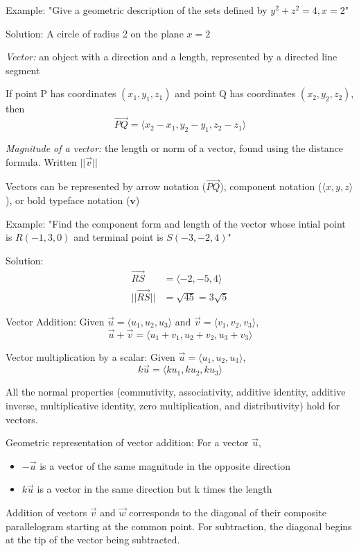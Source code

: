 \documentclass[12pt]{article}
\begin{document}
Example:
"Give a geometric description of the sets defined by $y^2 + z^2 = 4, x = 2$"

Solution:
A circle of radius 2 on the plane $x = 2$

\emph{Vector:} an object with a direction and a length, represented by a directed line segment

If point P has coordinates $(x_1, y_1, z_1)$ and point Q has coordinates $(x_2, y_2, z_2)$, then 
$$\vec{PQ} = \langle x_2 - x_1, y_2 - y_1, z_2 - z_1 \rangle$$

\emph{Magnitude of a vector:} the length or norm of a vector, found using the distance formula. Written $||\vec{v}||$

Vectors can be represented by arrow notation ($\vec{PQ}$), component notation ($\langle x, y, z\rangle$), or bold typeface notation ($\mathbf{v}$)

Example:
"Find the component form and length of the vector whose intial point is $R(-1, 3, 0)$ and terminal point is $S(-3, -2, 4)$"

Solution:
\begin{align*}
    \vec{RS} &= \langle -2, -5, 4\rangle\\
    ||\vec{RS}|| &= \sqrt{45} = 3\sqrt{5}
\end{align*}

Vector Addition:
Given $\vec{u} = \langle u_1, u_2, u_3\rangle$ and $\vec{v} = \langle v_1, v_2, v_3\rangle$,
$$\vec{u} + \vec{v} = \langle u_1 + v_1, u_2 + v_2, u_3 + v_3\rangle$$

Vector multiplication by a scalar:
Given $\vec{u} = \langle u_1, u_2, u_3\rangle$, 
$$k\vec{u} = \langle ku_1, ku_2, ku_3\rangle$$

All the normal properties (commutivity, associativity, additive identity, additive inverse, multiplicative identity, zero multiplication, and distributivity) hold for vectors.

Geometric representation of vector addition:
For a vector $\vec{u}$, 
\begin{itemize}
    \item $-\vec{u}$ is a vector of the same magnitude in the opposite direction
    \item $k\vec{u}$ is a vector in the same direction but k times the length
\end{itemize}

Addition of vectors $\vec{v}$ and $\vec{w}$ corresponds to the diagonal of their composite parallelogram starting at the common point. For subtraction, the diagonal begins at the tip of the vector being subtracted. 
\end{document}
